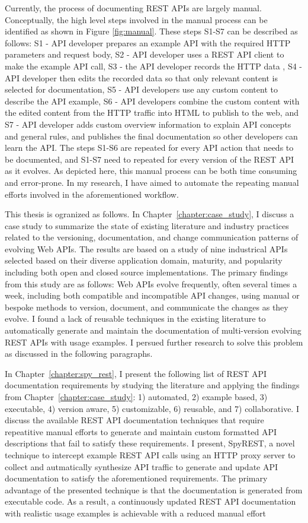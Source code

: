 Currently, the process of documenting REST APIs are largely manual. Conceptually, the high level steps involved in the manual process can be identified as shown in Figure \ref{fig:manual}. These steps S1-S7 can be described as follows: S1 - API developer prepares an example API with the required HTTP parameters and request body, S2 - API developer uses a REST API client to make the example API call, S3 - the API developer records the HTTP data , S4 - API developer then edits the recorded data so that only relevant content is selected for documentation, S5 - API developers use any custom content to describe the API example, S6 - API developers combine the custom content with the edited content from the HTTP traffic into HTML to publish to the web, and S7 - API developer adds custom overview information to explain API concepts and general rules, and publishes the final documentation so other developers can learn the API. The steps S1-S6 are repeated for every API action that needs to be documented, and S1-S7 need to repeated for every version of the REST API as it evolves. As depicted here, this manual process can be both time consuming and error-prone. In my research, I have aimed to automate the repeating manual efforts involved in the aforementioned workflow.

This thesis is ogranized as follows. In Chapter~\ref{chapter:case_study}, I discuss a case study to summarize the state of existing literature and industry practices related to the versioning, documentation, and change communication patterns of evolving Web APIs. The results are based on a study of nine industrical APIs selected based on their diverse application domain, maturity, and popularity including both open and closed source implementations. The primary findings from this study are as follows: Web APIs evolve frequently, often several times a week, including both compatible and incompatible API changes, using manual or bespoke methods to version, document, and communicate the changes as they evolve. I found a lack of reusable techniques in the existing literature to automatically generate and maintain the documentation of multi-version evolving REST APIs with usage examples. I persued further research to solve this problem as discussed in the following paragraphs.

In Chapter~\ref{chapter:spy_rest}, I present the following list of REST API documentation requirements by studying the literature and applying the findings from Chapter~\ref{chapter:case_study}: 1) automated, 2) example based, 3) executable, 4) version aware, 5) customizable, 6) reusable, and 7) collaborative. I discuss the available REST API documentation techniques that require repeatitive manual efforts to generate and maintain custom formatted API descriptions that fail to satisfy these requirements. I present, SpyREST, a novel technique to intercept example REST API calls using an HTTP proxy server to collect and autmatically synthesize API traffic to generate and update API documentation to satisfy the aforementioned requirements. The primary advantage of the presented technique is that the documentation is generated from executable code. As a result, a continuously updated REST API documentation with realistic usage examples is achievable with a reduced manual effort

